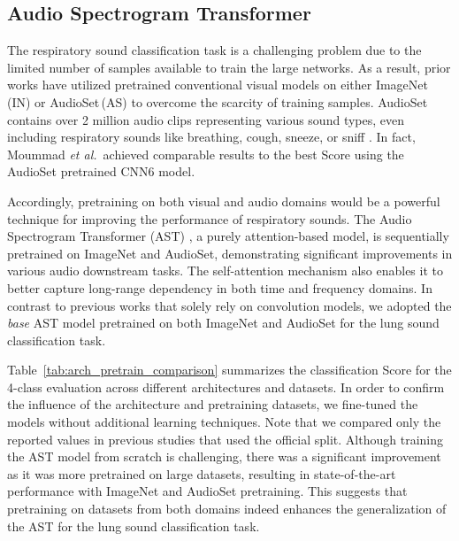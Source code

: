 \documentclass{INTERSPEECH2023}
\begin{document}
\subsection{Audio Spectrogram Transformer}
\vspace{-2pt}


The respiratory sound classification task is a challenging problem due to the limited number of samples available to train the large networks. As a result, prior works have utilized pretrained conventional visual models on either ImageNet\,(IN) or AudioSet\,(AS) to overcome the scarcity of training samples. 
AudioSet contains over 2 million audio clips representing various sound types, even including respiratory sounds like breathing, cough, sneeze, or sniff \cite{audioset}. In fact, Moummad \textit{et al.}\,\cite{moummad2022supervised} achieved comparable results to the best Score using the AudioSet pretrained CNN6 model.

Accordingly, pretraining on both visual and audio domains would be a powerful technique for improving the performance of respiratory sounds. The Audio Spectrogram Transformer (AST) \cite{gong2021ast}, a purely attention-based model, is sequentially pretrained on ImageNet and AudioSet, demonstrating significant improvements in various audio downstream tasks. The self-attention mechanism also enables it to better capture long-range dependency in both time and frequency domains. In contrast to previous works that solely rely on convolution models, we adopted the \textit{base} AST model pretrained on both ImageNet and AudioSet for the lung sound classification task.

Table \,\ref{tab:arch_pretrain_comparison} summarizes the classification Score for the 4-class evaluation across different architectures and datasets. In order to confirm the influence of the architecture and pretraining datasets, we fine-tuned the models without additional learning techniques. Note that we compared only the reported values in previous studies that used the official split.
Although training the AST model from scratch is challenging, there was a significant improvement as it was more pretrained on large datasets, resulting in state-of-the-art performance with ImageNet and AudioSet pretraining. This suggests that pretraining on datasets from both domains indeed enhances the generalization of the AST for the lung sound classification task.
\vspace{-5pt}
\end{document}
